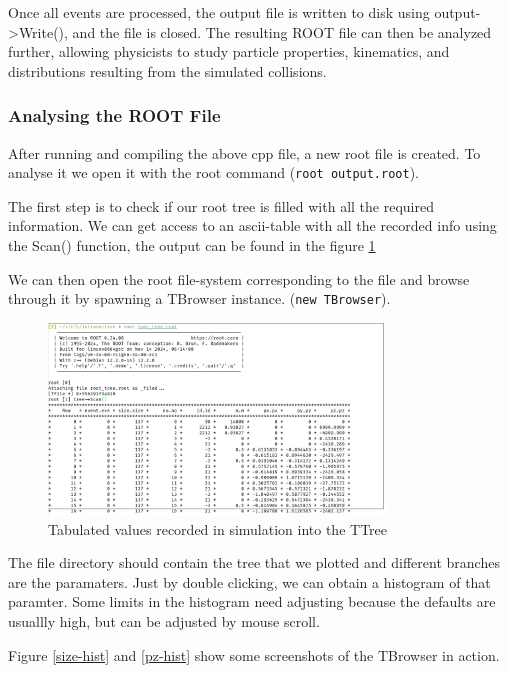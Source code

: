 \documentclass[letterpaper,12pt]{article}
\begin{document}
\begin{spacing}{1.125}
Once all events are processed, the output file is written to disk using output->Write(),
and the file is closed. The resulting ROOT file can then be analyzed further, allowing
physicists to study particle properties, kinematics, and distributions resulting from the
simulated collisions.

\subsubsection{Analysing the ROOT File}

After running and compiling the above cpp file, a new root file is created. To
analyse it we open it with the root command (\texttt{root output.root}).

The first step is to check if our root tree is filled with all the required
information. We can get access to an ascii-table with all the recorded info
using the Scan() function, the output can be found in the figure \ref{table}

We can then open the root file-system corresponding to the file and browse
through it by spawning a TBrowser instance. (\texttt{new TBrowser}).


\begin{figure}[!ht]
  \includegraphics[width=0.8\textwidth]{table.png}
  \caption{Tabulated values recorded in simulation into the TTree}
  \label{table}
\end{figure}


The file directory should contain the tree that we plotted and different
branches are the paramaters. Just by double clicking, we can obtain a histogram
of that paramter. Some limits in the histogram need adjusting because the
defaults are usuallly high, but can be adjusted by mouse scroll.

Figure \ref{size-hist} and \ref{pz-hist} show some screenshots of the TBrowser
in action.


\end{spacing}
\end{document}
